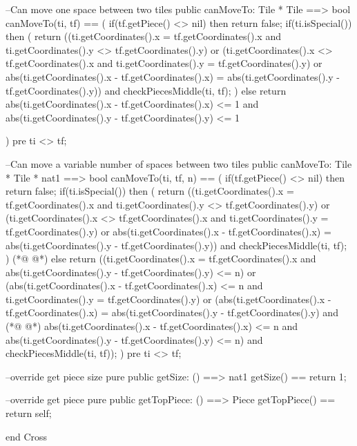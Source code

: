 \begin{vdmpp}[breaklines=true]
    --Can move one space between two tiles
  public canMoveTo: Tile * Tile ==> bool
  canMoveTo(ti, tf) == (
   if(tf.getPiece() <> nil)
    then return false;
   if(ti.isSpecial())
    then (
     return ((ti.getCoordinates().x = tf.getCoordinates().x and ti.getCoordinates().y <> tf.getCoordinates().y) or
          (ti.getCoordinates().x <> tf.getCoordinates().x and ti.getCoordinates().y = tf.getCoordinates().y) or
          abs(ti.getCoordinates().x - tf.getCoordinates().x) = abs(ti.getCoordinates().y - tf.getCoordinates().y)) and
          checkPiecesMiddle(ti, tf);
    )
   else
    return abs(ti.getCoordinates().x - tf.getCoordinates().x) <= 1 and
        abs(ti.getCoordinates().y - tf.getCoordinates().y) <= 1

  ) pre ti <> tf;
  
  --Can move a variable number of spaces between two tiles
  public canMoveTo: Tile * Tile * nat1 ==> bool
  canMoveTo(ti, tf, n) == (
   if(tf.getPiece() <> nil)
    then return false;
   if(ti.isSpecial())
    then (
     return ((ti.getCoordinates().x = tf.getCoordinates().x and ti.getCoordinates().y <> tf.getCoordinates().y) or
          (ti.getCoordinates().x <> tf.getCoordinates().x and ti.getCoordinates().y = tf.getCoordinates().y) or 
         abs(ti.getCoordinates().x - tf.getCoordinates().x) = abs(ti.getCoordinates().y - tf.getCoordinates().y)) and
          checkPiecesMiddle(ti, tf);
    )
(*@
\label{getSize:103}
@*)
   else return ((ti.getCoordinates().x = tf.getCoordinates().x and abs(ti.getCoordinates().y - tf.getCoordinates().y) <= n) or
           (abs(ti.getCoordinates().x - tf.getCoordinates().x) <= n and ti.getCoordinates().y = tf.getCoordinates().y) or 
          (abs(ti.getCoordinates().x - tf.getCoordinates().x) = abs(ti.getCoordinates().y - tf.getCoordinates().y) and
(*@
\label{getTopPiece:106}
@*)
            abs(ti.getCoordinates().x - tf.getCoordinates().x) <= n and abs(ti.getCoordinates().y - tf.getCoordinates().y) <= n)
            and checkPiecesMiddle(ti, tf));
   )
  pre ti <> tf;
  
  --override get piece size
  pure public getSize: () ==> nat1
  getSize() == return 1;
  
  --override get piece
  pure public getTopPiece: () ==> Piece
  getTopPiece() == return self;
  
end Cross
\end{vdmpp}
